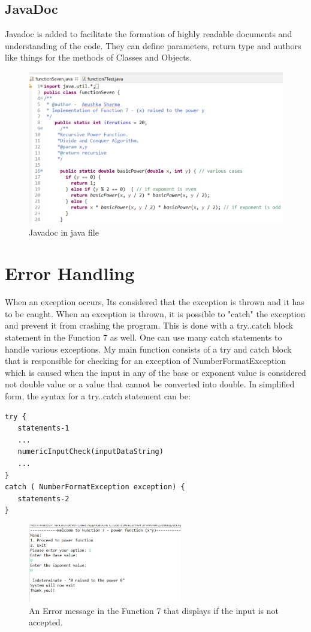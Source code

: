 \documentclass{article}
\begin{document}
\subsection*{JavaDoc}
Javadoc is added to facilitate the formation of highly readable documents and understanding of the code. They can define parameters, return type and authors like things for the methods of Classes and Objects.
\begin{figure}[htb]
    \centering
    \includegraphics{javadoc}
    \caption{Javadoc in java file}
    \label{fig:galaxy}
\end{figure}
\newpage
\section*{Error Handling}
When an exception occurs, Its considered that the exception is thrown and it has to be caught.
When an exception is thrown, it is possible to "catch" the exception and prevent it from crashing the program. This is done with a try..catch block statement in the Function 7 as well. One can use many catch statements to handle various exceptions.
My main function consists of a try and catch block that is responsible for checking for an exception of NumberFormatException which is caused when the input in any of the base or exponent value is considered not double value or a value that cannot be converted into double. 
In simplified form, the syntax for a try..catch statement can be:
\begin{lstlisting}
try {
   statements-1
   ...
   numericInputCheck(inputDataString)
   ...
}
catch ( NumberFormatException exception) {
   statements-2
}
\end{lstlisting}
\begin{figure}[htb]
\includegraphics[width=0.6\textwidth]{Image/error.png}
\centering
\caption{ An Error message in the Function 7 that displays if the input is not accepted.
}
\end{figure}
\end{document}
